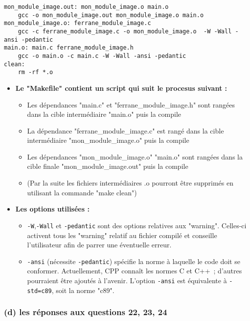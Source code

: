 \documentclass[11pt]{article}
\providecommand{\tightlist}{%
      \setlength{\itemsep}{0pt}\setlength{\parskip}{0pt}}
\begin{document}
\begin{verbatim}
mon_module_image.out: mon_module_image.o main.o
    gcc -o mon_module_image.out mon_module_image.o main.o
mon_module_image.o: ferrane_module_image.c 
    gcc -c ferrane_module_image.c -o mon_module_image.o  -W -Wall -ansi -pedantic
main.o: main.c ferrane_module_image.h
    gcc -o main.o -c main.c -W -Wall -ansi -pedantic
clean:
    rm -rf *.o
\end{verbatim}

\begin{itemize}
\tightlist
\item
  \textbf{Le "Makefile" contient un script qui suit le procesus suivant
  :}

  \begin{itemize}
  \tightlist
  \item
    Les dépendances "main.c" et "ferrane\_module\_image.h" sont rangées
    dans la cible intermédiaire "main.o" puis la compile
  \item
    La dépendance "ferrane\_module\_image.c" est rangé dans la cible
    intermédiaire "mon\_module\_image.o" puis la compile
  \item
    Les dépendances "mon\_module\_image.o" "main.o" sont rangées dans la
    cible finale "mon\_module\_image.out" puis la compile
  \item
    (Par la suite les fichiers intermédiaires .o pourront être supprimés
    en utilisant la commande "make clean")
  \end{itemize}
\item
  \textbf{Les options utilisées :}

  \begin{itemize}
  \item
    \texttt{-W},\texttt{-Wall} et \texttt{-pedantic} sont des options
    relatives aux "warning". Celles-ci activent tous les "warning"
    relatif au fichier compilé et conseille l'utilisateur afin de parrer
    une éventuelle erreur.
  \item
    \texttt{-ansi} (nécessite \texttt{-pedantic}) spécifie la norme à
    laquelle le code doit se conformer. Actuellement, CPP connaît les
    normes C et C++~; d'autres pourraient être ajoutés à l'avenir.
    L'option \texttt{-ansi} est équivalente à \texttt{-std=c89}, soit la
    norme "c89".
  \end{itemize}
\end{itemize}

\subsubsection{(d) les réponses aux questions 22, 23,
24}\label{d-les-ruxe9ponses-aux-questions-22-23-24}
\end{document}
